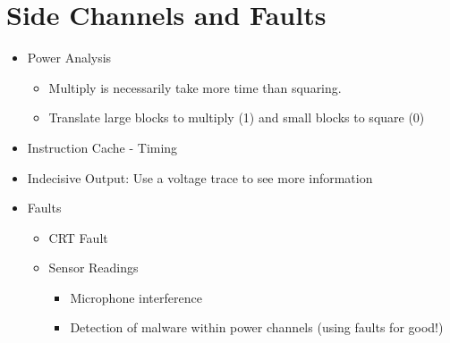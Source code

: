 \section{Side Channels and Faults} 
\begin{itemize} 
\item Power Analysis 
    \begin{itemize}
    \item Multiply is necessarily take more time than squaring.
    \item Translate large blocks to multiply (1) and small blocks to square (0)
    \end{itemize}
\item Instruction Cache - Timing
\item Indecisive Output: Use a voltage trace to see more information
\item Faults
    \begin{itemize}
    \item CRT Fault
    \item Sensor Readings
        \begin{itemize}
        \item Microphone interference
        \item Detection of malware within power channels (using faults for good!)
        \end{itemize}
    \end{itemize}
\end{itemize}
